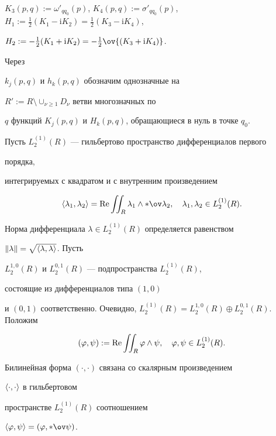 $K_3(p,q):=\omega'_{qq_0}(p)$, $K_4(p,q):=\sigma'_{qq_0}(p)$, $H_1:= 


\frac{1}{2}(K_1-{\mathrm i}K_2)=\frac{1}{2}(K_3-{\mathrm i}K_4)$, 


$H_2:=-\frac{1}{2}(K_1+{\mathrm i}K_2)=-\frac{1}{2} 


\ov{(K_3+{\mathrm i}K_4)}$. 


Через 


$k_j(p,q)$ и $h_k(p,q)$ обозначим однозначные на 


$R':=R\setminus\cup_{\nu\ge1}D_\nu$ ветви многозначных по 


$q$ функций $K_j(p,q)$ и $H_k(p,q)$, обращающиеся в нуль в точке $q_0$. 


 


Пусть $L^{(1)}_2(R)$ --- гильбертово пространство дифференциалов первого 


порядка, 


интегрируемых с квадратом и с внутренним произведением 


$$ 


\la\lambda_1,\lambda_2\ra=\re\iint_R \lambda_1\wedge\ast 


\ov\lambda_2,\quad \lambda_1,\lambda_2\in L^{(1)}_2(R). 


$$ 


Норма дифференциала $\lambda\in L^{(1)}_2(R)$ определяется равенством 


$\|\lambda\|=\sqrt{\langle\lambda,\lambda\rangle}$. Пусть 


$L^{1,0}_2(R)$ и $L^{0,1}_2(R)$ --- подпространства $L^{(1)}_2(R)$, 


состоящие из дифференциалов типа $(1,0)$ 


и $(0,1)$ соответственно. Очевидно, $L^{(1)}_2(R)=L^{1,0}_2(R)\oplus 


L^{0,1}_2(R)$. Положим 


$$ 


(\varphi,\psi):=\re\iint_R \varphi\wedge\psi,\quad 


\varphi,\psi\in L^{(1)}_2(R). 


$$ 


Билинейная форма $(\cdot,\cdot)$ связана со скалярным произведением 


$\langle\cdot,\cdot\rangle$ в гильбертовом 


пространстве $L^{(1)}_2(R)$ соотношением 


$\la\varphi,\psi\ra=(\varphi,\ast\ov\psi)$. 


\medskip 


